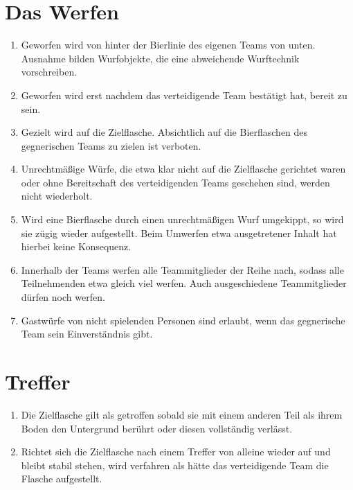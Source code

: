 \section{Das Werfen}
\begin{enumerate}[label={(\arabic*)}]
    \item
    Geworfen wird von hinter der Bierlinie des eigenen Teams von unten.
    Ausnahme bilden Wurfobjekte, die eine abweichende Wurftechnik vorschreiben.

    \item
    Geworfen wird erst nachdem das verteidigende Team bestätigt hat, bereit zu sein.

    \item
    Gezielt wird auf die Zielflasche.
    Absichtlich auf die Bierflaschen des gegnerischen Teams zu zielen ist verboten.

    \item
    Unrechtmäßige Würfe, die etwa klar nicht auf die Zielflasche gerichtet waren oder ohne Bereitschaft des verteidigenden Teams geschehen sind, werden nicht wiederholt.

    \item
    Wird eine Bierflasche durch einen unrechtmäßigen Wurf umgekippt, so wird sie zügig wieder aufgestellt.
    Beim Umwerfen etwa ausgetretener Inhalt hat hierbei keine Konsequenz.

    \item
    Innerhalb der Teams werfen alle Teammitglieder der Reihe nach, sodass alle Teilnehmenden etwa gleich viel werfen.
    Auch ausgeschiedene Teammitglieder dürfen noch werfen.

    \item
    Gastwürfe von nicht spielenden Personen sind erlaubt, wenn das gegnerische Team sein Einverständnis gibt.
\end{enumerate}

\section{Treffer}
\begin{enumerate}[label={(\arabic*)}]
    \item\label{Flunkyball:Treffer:Allg}
    Die Zielflasche gilt als getroffen sobald sie mit einem anderen Teil als ihrem Boden den Untergrund berührt oder diesen vollständig verlässt.

    \item 
    Richtet sich die Zielflasche nach einem Treffer von alleine wieder auf und bleibt stabil stehen, wird verfahren als hätte das verteidigende Team die Flasche aufgestellt.
\end{enumerate}

